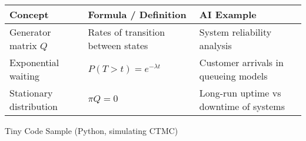 \documentclass[
  letterpaper,
  DIV=11,
  numbers=noendperiod]{scrreprt}
\begin{document}
\begin{longtable}[]{@{}
  >{\raggedright\arraybackslash}p{}
  >{\raggedright\arraybackslash}p{}
  >{\raggedright\arraybackslash}p{}@{}}
\toprule\noalign{}
\begin{minipage}[b]{\linewidth}\raggedright
Concept
\end{minipage} & \begin{minipage}[b]{\linewidth}\raggedright
Formula / Definition
\end{minipage} & \begin{minipage}[b]{\linewidth}\raggedright
AI Example
\end{minipage} \\
\midrule\noalign{}
\endhead
\bottomrule\noalign{}
\endlastfoot
Generator matrix \(Q\) & Rates of transition between states & System
reliability analysis \\
Exponential waiting & \(P(T>t)=e^{-\lambda t}\) & Customer arrivals in
queueing models \\
Stationary distribution & \(\pi Q = 0\) & Long-run uptime vs downtime of
systems \\
\end{longtable}

Tiny Code Sample (Python, simulating CTMC)
\end{document}
